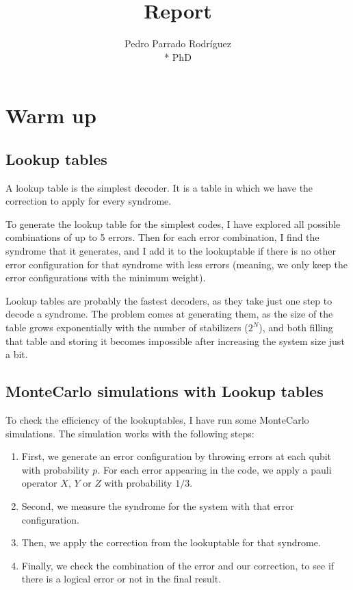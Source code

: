 \documentclass[a4paper,12pt]{article}
\author{Pedro Parrado Rodríguez\\* {\small PhD}}
\title{{\bf{Report}}}
\date{{\scriptsize }}
\begin{document}
\maketitle

\tableofcontents
\newpage


\section{Warm up}
\subsection{Lookup tables}

A lookup table is the simplest decoder. It is a table in which we have the correction to apply for every syndrome. 

To generate the lookup table for the simplest codes, I have explored all possible combinations of up to 5 errors. Then for each error combination, I find the syndrome that it generates, and I add it to the lookuptable if there is no other error configuration for that syndrome with less errors (meaning, we only keep the error configurations with the minimum weight).

Lookup tables are probably the fastest decoders, as they take just one step to decode a syndrome. The problem comes at generating them, as the size of the table grows exponentially with the number of stabilizers ($2^N$), and both filling that table and storing it becomes impossible after increasing the system size just a bit. 

\subsection{MonteCarlo simulations with Lookup tables}

To check the efficiency of the lookuptables, I have run some MonteCarlo simulations. The simulation works with the following steps:
\begin{enumerate}
\item First, we generate an error configuration by throwing errors at each qubit with probability $p$. For each error appearing in the code, we apply a pauli operator $X$, $Y$ or $Z$ with probability $1/3$.
\item Second, we measure the syndrome for the system with that error configuration.
\item Then, we apply the correction from the lookuptable for that syndrome.
\item Finally, we check the combination of the error and our correction, to see if there is a logical error or not in the final result.
\end{enumerate}
\end{document}
